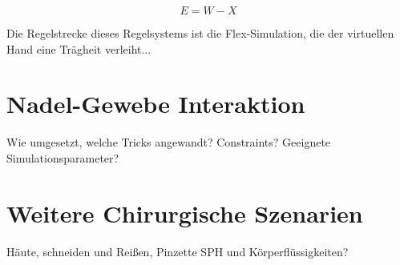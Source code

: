 \begin{equation}
E = W - X
\label{form_error}
\end{equation}

Die Regelstrecke dieses Regelsystems ist die Flex-Simulation, die der virtuellen Hand eine Trägheit verleiht...

\section{Nadel-Gewebe Interaktion}
\label{sec_needle}

Wie umgesetzt, welche Tricks angewandt? Constraints? Geeignete Simulationsparameter?

\section{Weitere Chirurgische Szenarien}
Häute, schneiden und Reißen, Pinzette
SPH und Körperflüssigkeiten?




